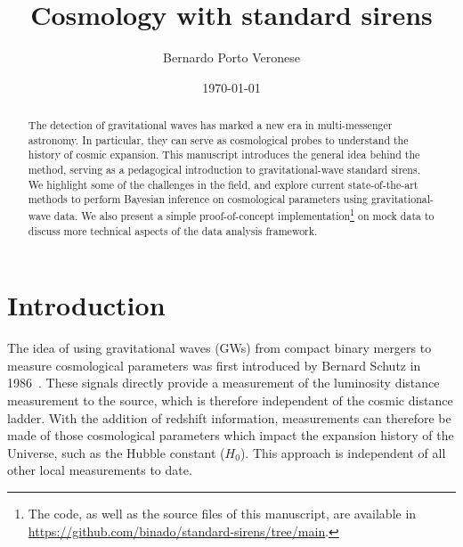 \documentclass[%
preprint,
nofootinbib,
 amsmath,amssymb,
 aps,
]{revtex4-2}
\begin{document}

\title{Cosmology with standard sirens}

\author{Bernardo Porto Veronese}
%


\date{\today}%

\begin{abstract}
	The detection of gravitational waves has marked a new era in multi-messenger astronomy.
	In particular, they can serve as cosmological probes to understand the history of cosmic expansion.
	This manuscript introduces the general idea behind the method, serving as a pedagogical introduction to gravitational-wave standard sirens.
	We highlight some of the challenges in the field, and explore current
	state-of-the-art methods to perform Bayesian inference on cosmological parameters using gravitational-wave data.
	We also present a simple proof-of-concept implementation\footnote{The code, as well as the source files of this manuscript, are available in \url{https://github.com/binado/standard-sirens/tree/main}.}
	on mock data to discuss more technical aspects of the data analysis framework.
\end{abstract}

\maketitle


\section{\label{sec:introduction}Introduction} The idea of using gravitational waves (GWs) from compact binary mergers to measure
cosmological parameters was first introduced by Bernard Schutz in 1986~\cite{Schutz:1986gp}. These
signals directly provide a measurement of the luminosity distance measurement to the source, which
is therefore independent of the cosmic distance ladder. With the addition of redshift information,
measurements can therefore be made of those cosmological parameters which impact the expansion
history of the Universe, such as the Hubble constant ($H_0$). This approach is independent of all
other local measurements to date.
\end{document}
